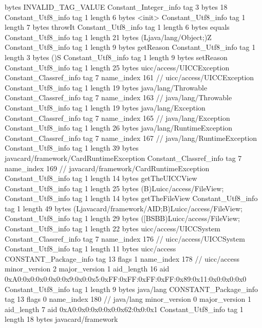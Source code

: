{{{			bytes	INVALID_TAG_VALUE
		}
		Constant_Integer_info {
			tag	3
			bytes	18
		}
		Constant_Utf8_info {
			tag	1
			length	6
			bytes	<init>
		}
		Constant_Utf8_info {
			tag	1
			length	7
			bytes	throwIt
		}
		Constant_Utf8_info {
			tag	1
			length	6
			bytes	equals
		}
		Constant_Utf8_info {
			tag	1
			length	21
			bytes	(Ljava/lang/Object;)Z
		}
		Constant_Utf8_info {
			tag	1
			length	9
			bytes	getReason
		}
		Constant_Utf8_info {
			tag	1
			length	3
			bytes	()S
		}
		Constant_Utf8_info {
			tag	1
			length	9
			bytes	setReason
		}
		Constant_Utf8_info {
			tag	1
			length	25
			bytes	uicc/access/UICCException
		}
		Constant_Classref_info {
			tag	7
			name_index	161		// uicc/access/UICCException
		}
		Constant_Utf8_info {
			tag	1
			length	19
			bytes	java/lang/Throwable
		}
		Constant_Classref_info {
			tag	7
			name_index	163		// java/lang/Throwable
		}
		Constant_Utf8_info {
			tag	1
			length	19
			bytes	java/lang/Exception
		}
		Constant_Classref_info {
			tag	7
			name_index	165		// java/lang/Exception
		}
		Constant_Utf8_info {
			tag	1
			length	26
			bytes	java/lang/RuntimeException
		}
		Constant_Classref_info {
			tag	7
			name_index	167		// java/lang/RuntimeException
		}
		Constant_Utf8_info {
			tag	1
			length	39
			bytes	javacard/framework/CardRuntimeException
		}
		Constant_Classref_info {
			tag	7
			name_index	169		// javacard/framework/CardRuntimeException
		}
		Constant_Utf8_info {
			tag	1
			length	14
			bytes	getTheUICCView
		}
		Constant_Utf8_info {
			tag	1
			length	25
			bytes	(B)Luicc/access/FileView;
		}
		Constant_Utf8_info {
			tag	1
			length	14
			bytes	getTheFileView
		}
		Constant_Utf8_info {
			tag	1
			length	49
			bytes	(Ljavacard/framework/AID;B)Luicc/access/FileView;
		}
		Constant_Utf8_info {
			tag	1
			length	29
			bytes	([BSBB)Luicc/access/FileView;
		}
		Constant_Utf8_info {
			tag	1
			length	22
			bytes	uicc/access/UICCSystem
		}
		Constant_Classref_info {
			tag	7
			name_index	176		// uicc/access/UICCSystem
		}
		Constant_Utf8_info {
			tag	1
			length	11
			bytes	uicc/access
		}
		CONSTANT_Package_info {
			tag	13
			flags	1
			name_index	178		// uicc/access
			minor_version	2
			major_version	1
			aid_length	16
			aid	0xA0:0x0:0x0:0x0:0x9:0x0:0x5:0xFF:0xFF:0xFF:0xFF:0x89:0x11:0x0:0x0:0x0
		}
		Constant_Utf8_info {
			tag	1
			length	9
			bytes	java/lang
		}
		CONSTANT_Package_info {
			tag	13
			flags	0
			name_index	180		// java/lang
			minor_version	0
			major_version	1
			aid_length	7
			aid	0xA0:0x0:0x0:0x0:0x62:0x0:0x1
		}
		Constant_Utf8_info {
			tag	1
			length	18
			bytes	javacard/framework
}}}
